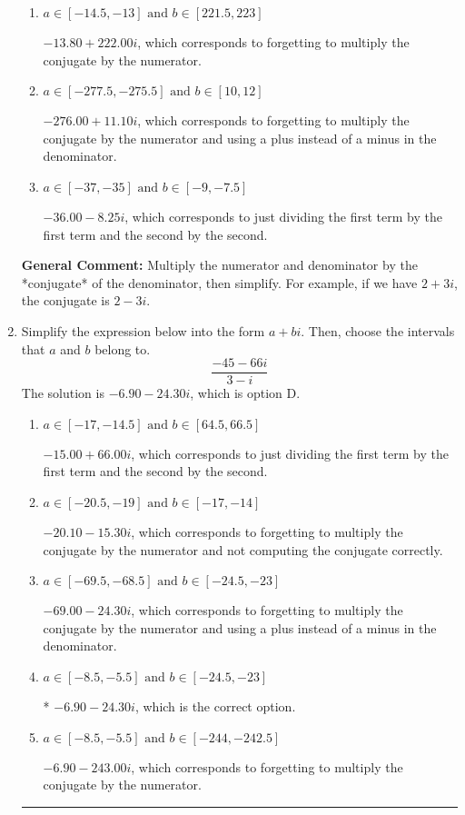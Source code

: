 \documentclass{extbook}[14pt]
\newcommand{\litem}[1]{\item #1

\rule{\textwidth}{0.4pt}}
\begin{document}
\begin{enumerate}
{\begin{enumerate}[label=\Alph*.]
* $-13.80  + 11.10 i$, which is the correct option.
\item \( a \in [-14.5, -13] \text{ and } b \in [221.5, 223] \)

 $-13.80  + 222.00 i$, which corresponds to forgetting to multiply the conjugate by the numerator.
\item \( a \in [-277.5, -275.5] \text{ and } b \in [10, 12] \)

 $-276.00  + 11.10 i$, which corresponds to forgetting to multiply the conjugate by the numerator and using a plus instead of a minus in the denominator.
\item \( a \in [-37, -35] \text{ and } b \in [-9, -7.5] \)

 $-36.00  - 8.25 i$, which corresponds to just dividing the first term by the first term and the second by the second.
\end{enumerate}

\textbf{General Comment:} Multiply the numerator and denominator by the *conjugate* of the denominator, then simplify. For example, if we have $2+3i$, the conjugate is $2-3i$.
}
\litem{
Simplify the expression below into the form $a+bi$. Then, choose the intervals that $a$ and $b$ belong to.
\[ \frac{-45 - 66 i}{3 - i} \]The solution is \( -6.90  - 24.30 i \), which is option D.\begin{enumerate}[label=\Alph*.]
\item \( a \in [-17, -14.5] \text{ and } b \in [64.5, 66.5] \)

 $-15.00  + 66.00 i$, which corresponds to just dividing the first term by the first term and the second by the second.
\item \( a \in [-20.5, -19] \text{ and } b \in [-17, -14] \)

 $-20.10  - 15.30 i$, which corresponds to forgetting to multiply the conjugate by the numerator and not computing the conjugate correctly.
\item \( a \in [-69.5, -68.5] \text{ and } b \in [-24.5, -23] \)

 $-69.00  - 24.30 i$, which corresponds to forgetting to multiply the conjugate by the numerator and using a plus instead of a minus in the denominator.
\item \( a \in [-8.5, -5.5] \text{ and } b \in [-24.5, -23] \)

* $-6.90  - 24.30 i$, which is the correct option.
\item \( a \in [-8.5, -5.5] \text{ and } b \in [-244, -242.5] \)

 $-6.90  - 243.00 i$, which corresponds to forgetting to multiply the conjugate by the numerator.
\end{enumerate}

}
\end{enumerate}
\end{document}
